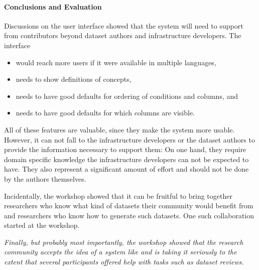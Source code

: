 \paragraph{Conclusions and Evaluation}
Discussions on the user interface showed that the system will need to support from contributors beyond dataset authors and infrastructure developers.
The interface
\begin{itemize}
\item would reach more users if it were available in multiple languages,
\item needs to show definitions of concepts,
\item needs to have good defaults for ordering of conditions and columns, and
\item needs to have good defaults for which columns are visible.
\end{itemize}
All of these features are valuable, since they make the system more usable.
However, it can not fall to the infrastructure developers or the dataset authors to provide the information necessary to support them:
On one hand, they require domain specific knowledge the infrastructure developers can not be expected to have.
They also represent a significant amount of effort and should not be done by the authors themselves.

Incidentally, the workshop showed that it can be fruitful to bring together  researchers who know what kind of datasets their community would benefit from and researchers who know how to generate such datasets.
One such collaboration started at the workshop.

\emph{Finally, but probably most importantly, 
the workshop showed that the research community accepts the idea of a system like \dmh
and is taking it seriously to the extent that several participants offered help with tasks such as dataset reviews.}



